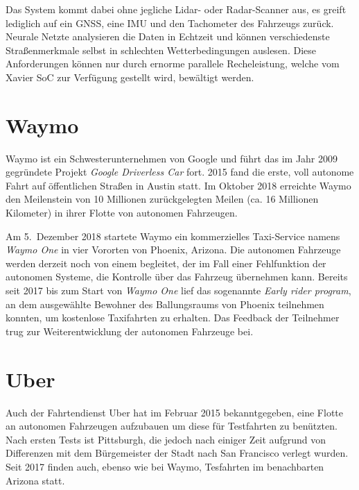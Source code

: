 Das System kommt dabei ohne jegliche \acs{Lidar}- oder \acs{Radar}-Scanner aus, es greift lediglich auf ein \ac{GNSS}, eine \ac{IMU} und den Tachometer des Fahrzeugs zurück. Neurale Netzte analysieren die Daten in Echtzeit und können verschiedenste Straßenmerkmale selbst in schlechten Wetterbedingungen auslesen. Diese Anforderungen können nur durch ernorme parallele Recheleistung, welche vom Xavier \ac{SoC} zur Verfügung gestellt wird, bewältigt werden. 


\section{Waymo}

Waymo ist ein Schwesterunternehmen von Google und führt das im Jahr 2009 gegründete Projekt \emph{Google Driverless Car} fort. 2015 fand die erste, voll autonome Fahrt auf öffentlichen Straßen in Austin statt. Im Oktober 2018 erreichte Waymo den Meilenstein von 10 Millionen zurückgelegten Meilen (ca. 16 Millionen Kilometer) in ihrer Flotte von autonomen Fahrzeugen.

Am 5.\ Dezember 2018 startete Waymo ein kommerzielles Taxi-Service namens \emph{Waymo One} in vier Vororten von Phoenix, Arizona. Die autonomen Fahrzeuge werden derzeit noch von einem  begleitet, der im Fall einer Fehlfunktion der autonomen Systeme, die Kontrolle über das Fahrzeug übernehmen kann.
 Bereits seit 2017 bis zum Start von \emph{Waymo One} lief das sogenannte \emph{Early rider program}, an dem ausgewählte Bewohner des Ballungsraums von Phoenix teilnehmen konnten, um kostenlose Taxifahrten zu erhalten. Das Feedback der Teilnehmer trug zur Weiterentwicklung der autonomen Fahrzeuge bei.


\section{Uber}

Auch der Fahrtendienst Uber hat im Februar 2015 bekanntgegeben, eine Flotte an autonomen Fahrzeugen aufzubauen um diese für Testfahrten zu benützten. Nach ersten Tests ist Pittsburgh, die jedoch nach einiger Zeit aufgrund von Differenzen mit dem Bürgemeister der Stadt nach San Francisco verlegt wurden. Seit 2017 finden auch, ebenso wie bei Waymo, Tesfahrten im benachbarten Arizona statt. 

